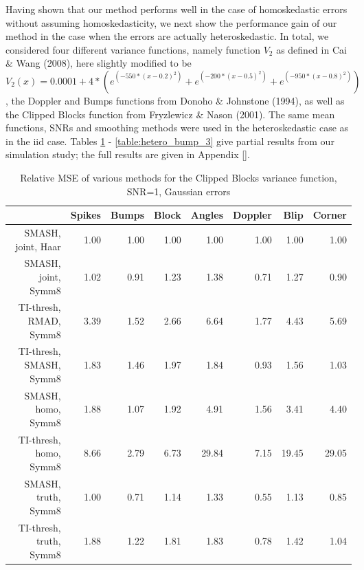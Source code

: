 \documentclass[12pt]{article}
\begin{document}
Having shown that our method performs well in the case of homoskedastic errors without assuming homoskedasticity, we next show the performance gain of our method in the case when the errors are actually heteroskedastic. In total, we considered four different variance functions, namely function $V_2$ as defined in Cai \& Wang (2008), here slightly modified to be
\[V_2(x)=0.0001+4*(e^{(-550*(x-0.2)^2)}+e^{(-200*(x-0.5)^2)}+e^{(-950*(x-0.8)^2)})\]
, the Doppler and Bumps functions from Donoho \& Johnstone (1994), as well as the Clipped Blocks function from Fryzlewicz \& Nason (2001). The same mean functions, SNRs and smoothing methods were used in the heteroskedastic case as in the iid case. Tables \ref{table:hetero_v2_1} - \ref{table:hetero_bump_3} give partial results from our simulation study; the full results are given in Appendix \ref{}.\\
\begin{table}[ht]
\centering
\begin{tabular}{rrrrrrrr}
  \hline
 & Spikes & Bumps & Block & Angles & Doppler & Blip & Corner \\
  \hline
SMASH, joint, Haar & 1.00 & 1.00 & 1.00 & 1.00 & 1.00 & 1.00 & 1.00 \\
  SMASH, joint, Symm8 & 1.02 & 0.91 & 1.23 & 1.38 & 0.71 & 1.27 & 0.90 \\
  TI-thresh, RMAD, Symm8 & 3.39 & 1.52 & 2.66 & 6.64 & 1.77 & 4.43 & 5.69 \\
  TI-thresh, SMASH, Symm8 & 1.83 & 1.46 & 1.97 & 1.84 & 0.93 & 1.56 & 1.03 \\
  SMASH, homo, Symm8 & 1.88 & 1.07 & 1.92 & 4.91 & 1.56 & 3.41 & 4.40 \\
  TI-thresh, homo, Symm8 & 8.66 & 2.79 & 6.73 & 29.84 & 7.15 & 19.45 & 29.05 \\
  SMASH, truth, Symm8 & 1.00 & 0.71 & 1.14 & 1.33 & 0.55 & 1.13 & 0.85 \\
  TI-thresh, truth, Symm8 & 1.88 & 1.22 & 1.81 & 1.83 & 0.78 & 1.42 & 1.04 \\
   \hline
\end{tabular}
\caption{Relative MSE of various methods for the Clipped Blocks variance function, SNR=1, Gaussian errors}
\label{table:hetero_v2_1}
\end{table}
\end{document}
